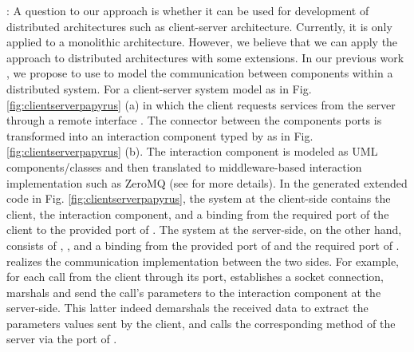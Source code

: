 \noindent
{}:
A question to our approach is whether it can be used for development of distributed architectures such as client-server architecture.
Currently, it is only applied to a monolithic architecture.
However, we believe that we can apply the approach to distributed architectures with some extensions.
In our previous work \cite{Pham2014}, we propose to use  to model the communication between components within a distributed system.
For a client-server system model as in Fig. \ref{fig:clientserverpapyrus} (a) in which the client requests services from the server through a remote interface .
The connector between the components ports is transformed into an  interaction component typed by  as in Fig. \ref{fig:clientserverpapyrus} (b).
The  interaction component is modeled as UML components/classes and then translated to middleware-based interaction implementation such as ZeroMQ (see \cite{Pham2014} for more details).
In the generated extended code in Fig. \ref{fig:clientserverpapyrus}, the system at the client-side contains the client, the  interaction component, and a binding from the  required port of the client to the  provided port of .
The system at the server-side, on the other hand, consists of , , and a binding from the  provided port of  and the  required port of .
 realizes the communication implementation between the two sides.
For example, for each call from the client through its port,  establishes a socket connection, marshals and send the call's parameters to the  interaction component at the server-side.
This latter indeed demarshals the received data to extract the parameters values sent by the client, and calls the corresponding method of the server via the  port of .  

